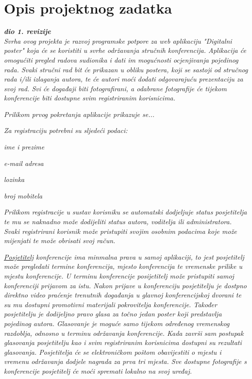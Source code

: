 \chapter{Opis projektnog zadatka}
		
		\textbf{\textit{dio 1. revizije}}\\
		
		\textit{Svrha ovog projekta je razvoj programske potpore za web aplikaciju "Digitalni poster" koja će se koristiti u svrhe održavanja stručnih konferencija. Aplikacija će omogućiti pregled radova sudionika i dati im mogućnosti ocjenjivanja pojedinog rada. Svaki stručni rad bit će prikazan u obliku postera, koji se sastoji od stručnog rada i/ili izlaganja autora, te će autori moći dodati odgovarajuću prezentaciju za svoj rad. Svi će događaji biti fotografirani, a odabrane fotografije će tijekom konferencije biti dostupne svim registriranim korisnicima.}

		\textit{Prilikom prvog pokretanja aplikacije prikazuje se...}

		\textit{Za registraciju potrebni su sljedeći podaci:}

		\begin{packed_item}
			\item \textit{ime i prezime}
			\item \textit{e-mail adresa}
			\item \textit{lozinka}
			\item \textit{broj mobitela}
		\end{packed_item}
		\textit{Prilikom registracije u sustav korisniku se automatski dodjeljuje status posjetitelja te mu se naknadno može dodijeliti status autora, voditelja ili administratora. Svaki registrirani korisnik može pristupiti svojim osobnim podacima koje može mijenjati te može obrisati svoj račun.}

		\textit{\underline{Posjetitelj} konferencije ima minmalna prava u samoj aplikaciji, to jest posjetitelj može pregledati termine konferencija, mjesto konferencija te vremenske prilike u mjestu konferencije. U terminu konferencije posijetitelj može pristupiti samoj konferenciji prijavom za istu. Nakon prijave u konferenciju posjetitelju je dostpno direktno video praćenje trenutnih događanja u glavnoj konferencijskoj dvorani te su mu dostupni promotivni materijali pokrovitelja konferencije. Također posjetitelju je dodijeljno pravo glasa za točno jedan poster koji predstavlja pojedinog autora. Glasovanje je moguće samo tijekom određenog vremenskog razdoblja, odnosno u terminu održavanja konferencije. Kada završi sam postupak glasovanja posjetitelju kao i svim registriranim korisnicima dostupni su rezultati glasovanja. Posjetitelja će se elektroničkom poštom obavijestiti o mjestu i vremenu održavanja dodjele nagrada za prva tri mjesta. Sve dostupne fotografije s konferencije posjetitelj će moći spremati lokalno na svoj uređaj.}


